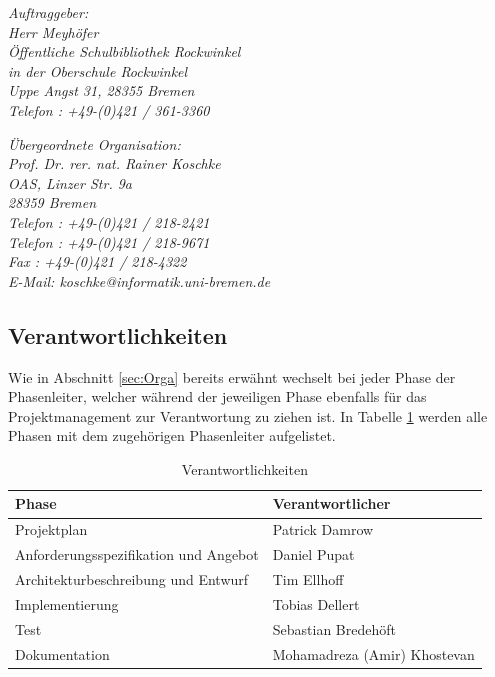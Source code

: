 \documentclass[fontsize=12pt,paper=a4,twoside]{scrartcl}
\begin{document}
{\em Auftraggeber:\\
	Herr Meyhöfer\\
	Öffentliche Schulbibliothek Rockwinkel\\
	in der Oberschule Rockwinkel\\
	Uppe Angst 31, 28355 Bremen\\
	Telefon : +49-(0)421 / 361-3360\\
}

{\em Übergeordnete Organisation:\\ 
	Prof. Dr. rer. nat. Rainer Koschke\\
	OAS, Linzer Str. 9a\\
	28359 Bremen\\
	Telefon : +49-(0)421 / 218-2421\\
	Telefon : +49-(0)421 / 218-9671\\
	Fax : +49-(0)421 / 218-4322\\
	E-Mail: koschke@informatik.uni-bremen.de
}


\subsection{Verantwortlichkeiten}

Wie in Abschnitt \ref{sec:Orga} bereits erwähnt wechselt bei jeder Phase der Phasenleiter, welcher während der jeweiligen Phase ebenfalls für das Projektmanagement zur Verantwortung zu ziehen ist. In Tabelle \ref{tab:respons} werden alle Phasen mit dem zugehörigen Phasenleiter aufgelistet.

\begin{table}[htbp]
\caption{Verantwortlichkeiten}
\label{tab:respons}
\centering
\begin{tabular}{p{}|p{}}
\hline Phase & Verantwortlicher \\ \hline
\hline Projektplan & Patrick Damrow\\
\hline Anforderungsspezifikation und Angebot & Daniel Pupat\\
\hline Architekturbeschreibung und Entwurf & Tim Ellhoff\\
\hline Implementierung & Tobias Dellert\\
\hline Test & Sebastian Bredehöft\\
\hline Dokumentation & Mohamadreza (Amir) Khostevan\\
\hline 
\end{tabular}
\end{table}
\end{document}
